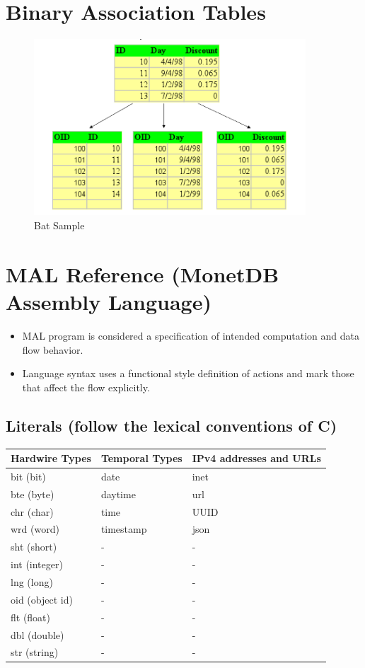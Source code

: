 \documentclass[11pt]{article}
\begin{document}
\section{Binary Association Tables}
\label{sec:org5c0294f}
\begin{figure}[htbp]
\centering
\includegraphics[width=4.0in]{./Pictures/BAT.png}
\caption{\label{fig:org957153d}
Bat Sample}
\end{figure}


\section{MAL Reference (MonetDB Assembly Language)}
\label{sec:org1e1bbd2}

\begin{itemize}
\item MAL program is considered a specification of intended computation and data flow behavior.
\item Language syntax uses a functional style definition of actions and mark those that affect the flow explicitly.
\end{itemize}

\subsection{Literals (follow the lexical conventions of C)}
\label{sec:org6cc5abb}

\begin{center}
\begin{tabular}{lll}
\hline
\textbf{Hardwire Types} & \textbf{Temporal Types} & \textbf{IPv4 addresses and URLs}\\
\hline
bit (bit) & date & inet\\
\hline
bte (byte) & daytime & url\\
\hline
chr (char) & time & UUID\\
\hline
wrd (word) & timestamp & json\\
\hline
sht (short) & - & -\\
\hline
int (integer) & - & -\\
\hline
lng (long) & - & -\\
\hline
oid (object id) & - & -\\
\hline
flt (float) & - & -\\
\hline
dbl (double) & - & -\\
\hline
str (string) & - & -\\
\hline
\end{tabular}
\end{center}
\end{document}
